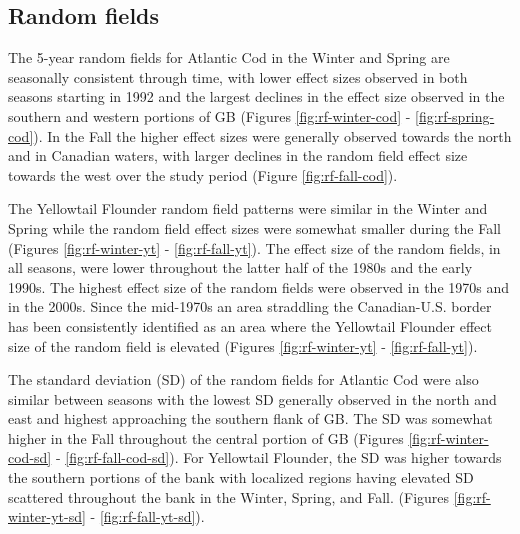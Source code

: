 \documentclass[
]{article}
\begin{document}
\clearpage

\hypertarget{random-fields}{%
\subsection{Random fields}\label{random-fields}}

The 5-year random fields for Atlantic Cod in the Winter and Spring are seasonally consistent through time, with lower effect sizes observed in both seasons starting in 1992 and the largest declines in the effect size observed in the southern and western portions of GB (Figures \ref{fig:rf-winter-cod} - \ref{fig:rf-spring-cod}). In the Fall the higher effect sizes were generally observed towards the north and in Canadian waters, with larger declines in the random field effect size towards the west over the study period (Figure \ref{fig:rf-fall-cod}).

The Yellowtail Flounder random field patterns were similar in the Winter and Spring while the random field effect sizes were somewhat smaller during the Fall (Figures \ref{fig:rf-winter-yt} - \ref{fig:rf-fall-yt}). The effect size of the random fields, in all seasons, were lower throughout the latter half of the 1980s and the early 1990s. The highest effect size of the random fields were observed in the 1970s and in the 2000s. Since the mid-1970s an area straddling the Canadian-U.S. border has been consistently identified as an area where the Yellowtail Flounder effect size of the random field is elevated (Figures \ref{fig:rf-winter-yt} - \ref{fig:rf-fall-yt}).

The standard deviation (SD) of the random fields for Atlantic Cod were also similar between seasons with the lowest SD generally observed in the north and east and highest approaching the southern flank of GB. The SD was somewhat higher in the Fall throughout the central portion of GB (Figures \ref{fig:rf-winter-cod-sd} - \ref{fig:rf-fall-cod-sd}). For Yellowtail Flounder, the SD was higher towards the southern portions of the bank with localized regions having elevated SD scattered throughout the bank in the Winter, Spring, and Fall. (Figures \ref{fig:rf-winter-yt-sd} - \ref{fig:rf-fall-yt-sd}).
\end{document}
